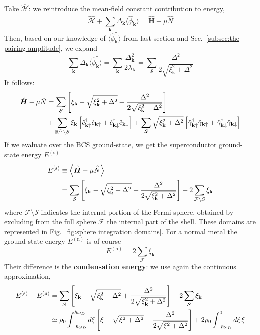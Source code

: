 Take $\hat{\mathcal{H}}$: we reintroduce the mean-field constant contribution to energy,
\[
	\hat{\mathcal{H}} + \sum_\mathbf{k} \Delta_\mathbf{k} \big\langle \hat{\phi}_\mathbf{k}^\dagger \big\rangle = \hat{\bm H} - \mu\hat{N}
\]
Then, based on our knowledge of $\big\langle \hat{\phi}_\mathbf{k}^\dagger \big\rangle$ from last section and Sec.~\ref{subsec:the pairing amplitude}, we expand
\[
	\sum_\mathbf{k} \Delta_\mathbf{k} \big\langle \hat{\phi}_\mathbf{k}^\dagger \big\rangle = \sum_\mathbf{k} \frac{\Delta_\mathbf{k}^2}{2\lambda_\mathbf{k}} = \sum_\mathcal{S} \frac{\Delta^2}{2\sqrt{\xi_\mathbf{k}^2 + \Delta^2}}
\]
It follows:
\[
\begin{aligned}
	\hat{\bm H} - \mu\hat{N} &= \sum_\mathcal{S} \left[{\xi_\mathbf{k} - \sqrt{\xi_\mathbf{k}^2 + \Delta^2} + \frac{\Delta^2}{2\sqrt{\xi_\mathbf{k}^2 + \Delta^2}}}\right] \\ 		
	&+ \sum_{\mathbb{R}^D\setminus\mathcal{S}} \xi_\mathbf{k} \left[{ \hat{c}_{\mathbf{k}\uparrow}^\dagger \hat{c}_{\mathbf{k}\uparrow}
	+ \hat{c}_{\mathbf{k}\downarrow}^\dagger \hat{c}_{\mathbf{k}\downarrow}}\right]
	+ \sum_\mathcal{S} \sqrt{\xi_\mathbf{k}^2 + \Delta^2} \left[{ \hat{\gamma}_{\mathbf{k}\uparrow}^\dagger \hat{\gamma}_{\mathbf{k}\uparrow} + \hat{\gamma}_{\mathbf{k}\downarrow}^\dagger \hat{\gamma}_{\mathbf{k}\downarrow}}\right]
\end{aligned}
\]
If we evaluate over the BCS ground-state, we get the superconductor ground-state energy $E^{(\mathrm{s})}$
\[
\begin{aligned}
	E^{(\mathrm{s})} &\equiv \ev{\hat{\bm H} - \mu\hat{N}} \\
	&= \sum_\mathcal{S} \lrS{\xi_\mathbf{k} - \sqrt{\xi_\mathbf{k}^2 + \Delta^2} + \frac{\Delta^2}{2\sqrt{\xi_\mathbf{k}^2 + \Delta^2}}}
	+ 2 \sum_{\mathcal{F}\setminus\mathcal{S}} \xi_\mathbf{k}
\end{aligned}
\]
where $\mathcal{F}\setminus\mathcal{S}$ indicates the internal portion of the Fermi sphere, obtained by excluding from the full sphere $\mathcal{F}$ the internal part of the shell. These domains are represented in Fig.~\ref{fig:sphere integration domains}.
For a normal metal the ground state energy $E^{(\mathrm{n})}$ is of course
\[
	E^{(\mathrm{n})} = 2 \sum_\mathcal{F} \xi_\mathbf{k}
\]
Their difference is the \textbf{condensation energy}: we use again the continuous approximation,
\[
\begin{aligned}
	E^{(\mathrm{s})} - E^{(\mathrm{n})} &= \sum_\mathcal{S} \left[{\xi_\mathbf{k} - \sqrt{\xi_\mathbf{k}^2 + \Delta^2} + \frac{\Delta^2}{2\sqrt{\xi_\mathbf{k}^2 + \Delta^2}}}\right]
	+ 2 \sum_\mathcal{S} \xi_\mathbf{k} \\
	&\simeq \rho_0 \int_{-\hbar\omega_D}^{\hbar\omega_D} d\xi \left[{\xi - \sqrt{\xi^2 + \Delta^2} + \frac{\Delta^2}{2\sqrt{\xi^2 + \Delta^2}}}\right] + 2 \rho_0 \int_{-\hbar\omega_D}^0 d\xi \, \xi
\end{aligned}
\]

